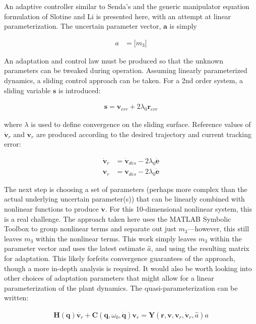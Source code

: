 \documentclass[letterpaper, 10 pt, conference]{ieeeconf}  %
\begin{document}
An adaptive controller similar to Senda's and the generic manipulator equation formulation of Slotine and Li is presented here, with an attempt at linear parameterization. The uncertain parameter vector, $\mathbf{a}$ is simply 
 
\begin{align}
	a &= \lbrack m_3 \rbrack
\end{align}
 
 An adaptation and control law must be produced so that the unknown parameters can be tweaked during operation. Assuming linearly parameterized dynamics, a sliding control approach can be taken. For a 2nd order system, a sliding variable $\mathbf{s}$ is introduced:
 
 \begin{align}
 	\mathbf{s} = \mathbf{v}_{err} + 2 \lambda_0 \mathbf{r}_{err}
 \end{align}
 
 where $\lambda$ is used to define convergence on the sliding surface. Reference values of $\dot{\mathbf{v}}_r$ and ${\mathbf{v}}_r$ are produced according to the desired trajectory and current tracking error:
 
 \begin{align}
 	\dot{\mathbf{v}}_r &= \dot{\mathbf{v}}_{des} - 2\lambda_0 \dot{\mathbf{e}}\\
 	\mathbf{v}_r &= \mathbf{v}_{des} - 2\lambda_0 \dot{\mathbf{e}}
 \end{align}
 
 The next step is choosing a set of parameters (perhaps more complex than the actual underlying uncertain parameter(s)) that can be linearly combined with nonlinear functions to produce $\dot{\mathbf{v}}$. For this 10-dimensional nonlinear system, this is a real challenge. The approach taken here uses the MATLAB Symbolic Toolbox to group nonlinear terms and separate out just $m_3$---however, this still leaves $m_3$ within the nonlinear terms. This work simply leaves $m_3$ within the parameter vector and uses the latest estimate $\hat{a}$, and using the resulting matrix for adaptation. This likely forfeits convergence guarantees of the approach, though a more in-depth analysis is required. It would also be worth looking into other choices of adaptation parameters that might allow for a linear parameterization of the plant dynamics. The quasi-parameterization can be written:
 
 \begin{align}
 	\mathbf{H}(\mathbf{q})\dot{\mathbf{v}_r} + \mathbf{C}(\mathbf{q}, \omega_0, \dot{\mathbf{q}})\mathbf{v}_r = \mathbf{Y}(\mathbf{r},\mathbf{v},\mathbf{v}_r,\dot{\mathbf{v}}_r, \hat{a})a
 \end{align}
\end{document}
